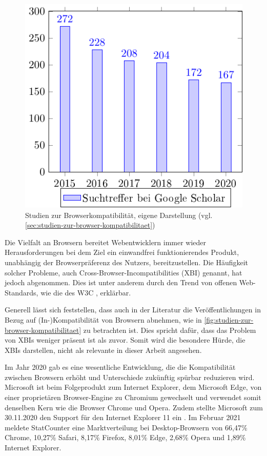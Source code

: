 \begin{figure}
\centering
\includegraphics[width=\linewidth]{img/02_theorie/cross-browser_metastudie.png.pdf}
\caption{Studien zur Browserkompatibilität, eigene Darstellung (vgl. \autoref{sec:studien-zur-browser-kompatibilitaet})}
\label{fig:studien-zur-browser-kompatibilitaet}
\end{figure}

Die Vielfalt an Browsern bereitet Webentwicklern immer wieder Herausforderungen bei dem Ziel ein einwandfrei funktionierendes Produkt, unabhängig der Browserpräferenz des Nutzers, bereitzustellen. Die Häufigkeit solcher Probleme, auch Cross-Browser-Incompatibilities (XBI) \cite{XBIs} genannt, hat jedoch abgenommen. Dies ist unter anderem durch den Trend von offenen Web-Standards, wie die des W3C \cite{W3CStandards}, erklärbar.


Generell lässt sich feststellen, dass auch in der Literatur die Veröffentlichungen in Bezug auf (In-)Kompatibilität von Browsern abnehmen, wie in \autoref{fig:studien-zur-browser-kompatibilitaet} zu betrachten ist. Dies spricht dafür, dass das Problem von XBIs weniger präsent ist als zuvor. Somit wird die besondere Hürde, die XBIs darstellen, nicht als relevante in dieser Arbeit angesehen.

Im Jahr 2020 gab es eine wesentliche Entwicklung, die die Kompatibilität zwischen Browsern erhöht und Unterschiede zukünftig spürbar reduzieren wird. Microsoft ist beim Folgeprodukt zum Internet Explorer, dem Microsoft Edge, von einer proprietären Browser-Engine zu Chromium gewechselt \cite{MicrosoftEdgeChromium} und verwendet somit denselben Kern wie die Browser Chrome und Opera. Zudem stellte Microsoft zum 30.11.2020 den Support für den Internet Explorer 11 ein \cite{MicrosoftInternetExplorerDeprecation}. Im Februar 2021 meldete StatCounter \cite{StatCounterBrowserMarketshare} eine Marktverteilung bei Desktop-Browsern von 66,47\% Chrome, 10,27\% Safari, 8,17\% Firefox, 8,01\% Edge, 2,68\% Opera und 1,89\% Internet Explorer.

